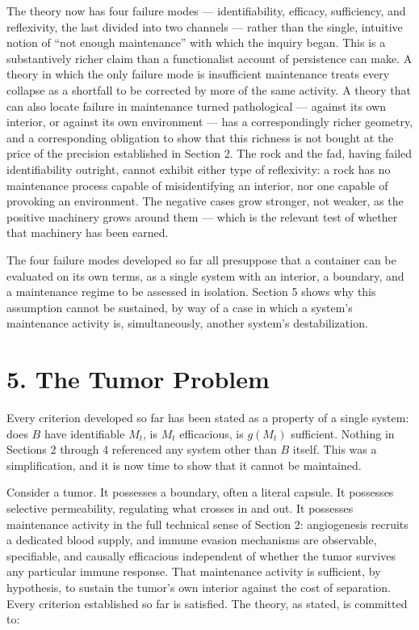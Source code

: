\documentclass[11pt]{article}
\theoremstyle{plain}
\begin{document}
The theory now has four failure modes --- identifiability, efficacy, sufficiency, and reflexivity, the last divided into two channels --- rather than the single, intuitive notion of ``not enough maintenance'' with which the inquiry began. This is a substantively richer claim than a functionalist account of persistence can make. A theory in which the only failure mode is insufficient maintenance treats every collapse as a shortfall to be corrected by more of the same activity. A theory that can also locate failure in maintenance turned pathological --- against its own interior, or against its own environment --- has a correspondingly richer geometry, and a corresponding obligation to show that this richness is not bought at the price of the precision established in Section 2. The rock and the fad, having failed identifiability outright, cannot exhibit either type of reflexivity: a rock has no maintenance process capable of misidentifying an interior, nor one capable of provoking an environment. The negative cases grow stronger, not weaker, as the positive machinery grows around them --- which is the relevant test of whether that machinery has been earned.

The four failure modes developed so far all presuppose that a container can be evaluated on its own terms, as a single system with an interior, a boundary, and a maintenance regime to be assessed in isolation. Section 5 shows why this assumption cannot be sustained, by way of a case in which a system's maintenance activity is, simultaneously, another system's destabilization.

\section*{5. The Tumor Problem}

Every criterion developed so far has been stated as a property of a single system: does \(B\) have identifiable \(M_t\), is \(M_t\) efficacious, is \(g(M_t)\) sufficient. Nothing in Sections 2 through 4 referenced any system other than \(B\) itself. This was a simplification, and it is now time to show that it cannot be maintained.

Consider a tumor. It possesses a boundary, often a literal capsule. It possesses selective permeability, regulating what crosses in and out. It possesses maintenance activity in the full technical sense of Section 2: angiogenesis recruits a dedicated blood supply, and immune evasion mechanisms are observable, specifiable, and causally efficacious independent of whether the tumor survives any particular immune response. That maintenance activity is sufficient, by hypothesis, to sustain the tumor's own interior against the cost of separation. Every criterion established so far is satisfied. The theory, as stated, is committed to:
\end{document}
